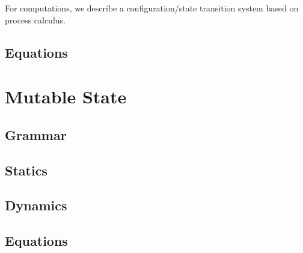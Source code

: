 \documentclass[letterpaper]{article}
\begin{document}
For computations, we describe a configuration/state transition system based on process calculus. 

\subsection{Equations}

\section{Mutable State}

\subsection{Grammar}
\subsection{Statics}
\subsection{Dynamics}
\subsection{Equations}
\end{document}
